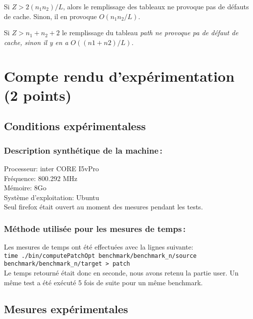 \documentclass[a4paper, 10pt, french]{article}
\begin{document}
Si $Z>2(n_1n_2)/L$, alors le remplissage des tableaux ne provoque pas de défauts de cache. Sinon, il en provoque $O(n_1n_2/L)$.

Si $Z > n_1+n_2+2$   le remplissage du tableau \it path \rm ne provoque pa de défaut de cache, sinon il y en a $O((n1+n2)/L)$.
\section{Compte rendu d'expérimentation (2 points)}
  \subsection{Conditions expérimentaless}
     
    \subsubsection{Description synthétique de la machine\,:} 
      {Processeur: inter CORE I5vPro\\
      Fréquence: 800.292 MHz\\
      Mémoire: 8Go\\
      Système d'exploitation: Ubuntu\\
       Seul firefox était ouvert au moment des mesures pendant les tests.
      } 

    \subsubsection{Méthode utilisée pour les mesures de temps\,: } 
      {
       Les mesures de temps ont été effectuées avec la lignes suivante:\\
       \verb+time ./bin/computePatchOpt benchmark/benchmark_n/source benchmark/benchmark_n/target > patch+ \\
       Le temps retourné était donc en seconde, nous avons retenu la partie user.
       Un même test a été exécuté 5 fois de suite pour un même benchmark.
      }

  \subsection{Mesures expérimentales}
\end{document}
